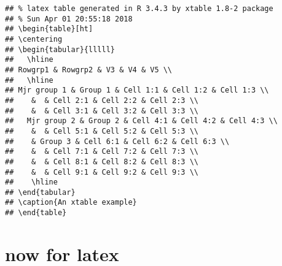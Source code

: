 \documentclass[]{article}
\begin{document}
\begin{verbatim}
## % latex table generated in R 3.4.3 by xtable 1.8-2 package
## % Sun Apr 01 20:55:18 2018
## \begin{table}[ht]
## \centering
## \begin{tabular}{lllll}
##   \hline
## Rowgrp1 & Rowgrp2 & V3 & V4 & V5 \\ 
##   \hline
## Mjr group 1 & Group 1 & Cell 1:1 & Cell 1:2 & Cell 1:3 \\ 
##    &  & Cell 2:1 & Cell 2:2 & Cell 2:3 \\ 
##    &  & Cell 3:1 & Cell 3:2 & Cell 3:3 \\ 
##   Mjr group 2 & Group 2 & Cell 4:1 & Cell 4:2 & Cell 4:3 \\ 
##    &  & Cell 5:1 & Cell 5:2 & Cell 5:3 \\ 
##    & Group 3 & Cell 6:1 & Cell 6:2 & Cell 6:3 \\ 
##    &  & Cell 7:1 & Cell 7:2 & Cell 7:3 \\ 
##    &  & Cell 8:1 & Cell 8:2 & Cell 8:3 \\ 
##    &  & Cell 9:1 & Cell 9:2 & Cell 9:3 \\ 
##    \hline
## \end{tabular}
## \caption{An xtable example} 
## \end{table}
\end{verbatim}

\section{now for latex}\label{now-for-latex}
\end{document}
